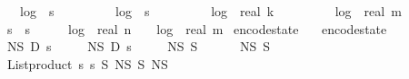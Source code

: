 \begin{isabellebody}
\ \ \ \ {}\ {\isacharasterisk}{\kern0pt}\ log\ {}\ {\isacharparenleft}{\kern0pt}s\ {\isacharplus}{\kern0pt}\ {}{\isacharparenright}{\kern0pt}\ {\isacharplus}{\kern0pt}\isanewline
\ \ \ \ {}\ {\isacharasterisk}{\kern0pt}\ log\ {}\ {\isacharparenleft}{\kern0pt}s\ {\isacharplus}{\kern0pt}\ {}{\isacharparenright}{\kern0pt}\ {\isacharplus}{\kern0pt}\isanewline
\ \ \ \ {}\ {\isacharasterisk}{\kern0pt}\ log\ {}\ {\isacharparenleft}{\kern0pt}real\ k\ {\isacharplus}{\kern0pt}\ {}{\isacharparenright}{\kern0pt}\ {\isacharplus}{\kern0pt}\isanewline
\ \ \ \ {}\ {\isacharasterisk}{\kern0pt}\ log\ {}\ {\isacharparenleft}{\kern0pt}real\ m\ {\isacharplus}{\kern0pt}\ {}{\isacharparenright}{\kern0pt}\ {\isacharplus}{\kern0pt}\isanewline
\ \ \ \ s\ {\isacharasterisk}{\kern0pt}\ s\ {\isacharasterisk}{\kern0pt}\ {\isacharparenleft}{\kern0pt}{}\ {\isacharplus}{\kern0pt}\ {}\ {\isacharasterisk}{\kern0pt}\ log\ {}\ {\isacharparenleft}{\kern0pt}real\ n{\isacharparenright}{\kern0pt}\ {\isacharplus}{\kern0pt}\ {}\ {\isacharasterisk}{\kern0pt}\ log\ {}\ {\isacharparenleft}{\kern0pt}real\ m{\isacharparenright}{\kern0pt}{\isacharparenright}{\kern0pt}{\isacharparenright}{\kern0pt}{\isachardoublequoteclose}\isanewline
\isanewline
{}\isamarkupfalse%
\ encode{\isacharunderscore}{\kern0pt}state\ \isanewline
\ \ {\isachardoublequoteopen}encode{\isacharunderscore}{\kern0pt}state\ {\isacharequal}{\kern0pt}\ \isanewline
\ \ \ \ N\isactrlsub S\ {\isasymtimes}\isactrlsub D\ {\isacharparenleft}{\kern0pt}{\isasymlambda}s\ \isanewline
\ \ \ \ N\isactrlsub S\ {\isasymtimes}\isactrlsub D\ {\isacharparenleft}{\kern0pt}{\isasymlambda}s\ \isanewline
\ \ \ \ N\isactrlsub S\ {\isasymtimes}\isactrlsub S\ \ \isanewline
\ \ \ \ N\isactrlsub S\ {\isasymtimes}\isactrlsub S\ \ \isanewline
\ \ \ \ {\isacharparenleft}{\kern0pt}List{\isachardot}{\kern0pt}product\ {\isacharbrackleft}{\kern0pt}{}{\isachardot}{\kern0pt}{\isachardot}{\kern0pt}{\isacharless}{\kern0pt}s\ {\isacharbrackleft}{\kern0pt}{}{\isachardot}{\kern0pt}{\isachardot}{\kern0pt}{\isacharless}{\kern0pt}s\ {\isasymrightarrow}\isactrlsub S\ {\isacharparenleft}{\kern0pt}N\isactrlsub S\ {\isasymtimes}\isactrlsub S\ N\isactrlsub S{\isacharparenright}{\kern0pt}{\isacharparenright}{\kern0pt}{\isacharparenright}{\kern0pt}{\isacharparenright}{\kern0pt}{\isachardoublequoteclose}\isanewline

\end{isabellebody}
